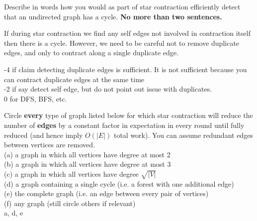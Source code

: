 %

\begin{problem}
\ask
Describe in words how you would as part of star contraction 
efficiently detect that an undirected graph has a cycle.  \textbf{No more than two sentences.}

\sol
If during star contraction we find any self edges not involved in
contraction itself then there is a cycle.   However,
we need to be careful not to remove duplicate edges, and only to
contract along a single duplicate edge.

-4 if claim detecting duplicate edges is sufficient.  It is not sufficient because you can contract duplicate edges at the same time\\
%
-2 if say detect self edge, but do not point out issue with duplicates.\\
%
0 for DFS, BFS, etc.
\end{problem}


%
%
\begin{problem}
\ask
Circle \textbf{every} type of graph listed below for which star
contraction will reduce the number of \textbf{edges} by a constant
factor in expectation in every round until fully reduced (and hence
imply $O(|E|)$ total work).  You can assume redundant edges between
vertices are removed.\\

(a) a graph in which all vertices have degree at most 2\\
(b) a graph in which all vertices have degree at most 3\\
(c) a graph in which all vertices have degree $\sqrt{|V|}$\\
(d) a graph containing a single cycle (i.e. a forest with one additional edge)\\
(e) the complete graph (i.e. an edge between every pair of vertices)\\
(f) any graph (still circle others if relevant)\\

\sol
a, d, e
\end{problem}


